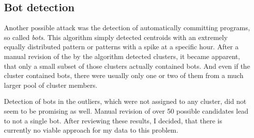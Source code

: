 \subsection{Bot detection}
Another possible attack was the detection of automatically committing programs, so called \emph{bots}.
This algorithm simply detected centroids with an extremely equally distributed pattern or patterns with a spike at a specific hour.
After a manual revision of the by the algorithm detected clusters, it became apparent, that only a small subset of those clusters actually contained bots.
And even if the cluster contained bots, there were usually only one or two of them from a much larger pool of cluster members.

Detection of bots in the outliers, which were not assigned to any cluster, did not seem to be promising as well.
Manual revision of over 50 possible candidates lead to not a single bot.
After reviewing these results, I decided, that there is currently no viable approach for my data to this problem.
